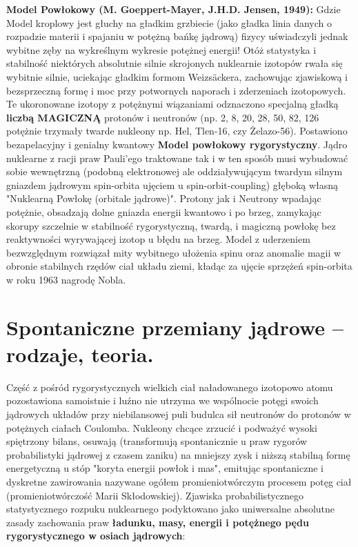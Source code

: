 \documentclass[11pt, a4paper]{article}
\begin{document}
\textbf{Model Powłokowy (M. Goeppert-Mayer, J.H.D. Jensen, 1949):}
Gdzie Model kroplowy jest głuchy na gładkim grzbiecie (jako gładka linia danych o rozpadzie materii i spajaniu w potężną bańkę jądrową) fizycy uświadczyli jednak wybitne zęby na wykreślnym wykresie potężnej energii! Otóż statystyka i stabilność niektórych absolutnie silnie skrojonych nuklearnie izotopów rwała się wybitnie silnie, uciekając gładkim formom Weizsäckera, zachowując zjawiskową i bezsprzeczną formę i moc przy potwornych naporach i zderzeniach izotopowych. Te ukoronowane izotopy z potężnymi wiązaniami odznaczono specjalną gładką \textbf{liczbą MAGICZNĄ} protonów i neutronów (np. 2, 8, 20, 28, 50, 82, 126 potężnie trzymały twarde nukleony np. Hel, Tlen-16, czy Żelazo-56).
Postawiono bezapelacyjny i genialny kwantowy \textbf{Model powłokowy rygorystyczny}. Jądro nuklearne z racji praw Pauli'ego traktowane tak i w ten sposób musi wybudować sobie wewnętrzną (podobną elektronowej ale oddziaływującym twardym silnym gniazdem jądrowym spin-orbita ujęciem u spin-orbit-coupling) głęboką własną "Nuklearną Powłokę (orbitale jądrowe)". Protony jak i Neutrony wpadając potężnie, obsadzają dolne gniazda energii kwantowo i po brzeg, zamykając skorupy szczelnie w stabilność rygorystyczną, twardą, i magiczną powłokę bez reaktywności wyrywającej izotop u błędu na brzeg. Model z uderzeniem bezwzględnym rozwiązał mity wybitnego ułożenia spinu oraz anomalie magii w obronie stabilnych rzędów ciał układu ziemi, kładąc za ujęcie sprzężeń spin-orbita w roku 1963 nagrodę Nobla.

\section{Spontaniczne przemiany jądrowe – rodzaje, teoria.}

Część z pośród rygorystycznych wielkich ciał naładowanego izotopowo atomu pozostawiona samoistnie i luźno nie utrzyma we wspólnocie potęgi swoich jądrowych układów przy niebilansowej puli budulca sił neutronów do protonów w potężnych ciałach Coulomba. Nukleony chcące zrzucić i podważyć wysoki spiętrzony bilans, osuwają (transformują spontanicznie u praw rygorów probabilistyki jądrowej z czasem zaniku) na mniejszy zysk i niższą stabilną formę energetyczną u stóp "koryta energii powłok i mas", emitując spontaniczne i dyskretne zawirowania nazywane ogółem promieniotwórczym procesem potęg ciał (promieniotwórczość Marii Skłodowskiej). Zjawiska probabilistycznego statystycznego rozpuku nuklearnego podyktowano jako uniwersalne absolutne zasady zachowania praw \textbf{ładunku, masy, energii i potężnego pędu rygorystycznego w osiach jądrowych}:
\end{document}
